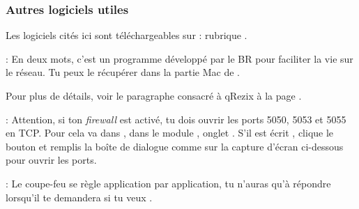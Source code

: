 \subsubsection{Autres logiciels utiles}

Les logiciels cités ici sont téléchargeables sur  : rubrique .

 \noindent{} : En deux mots, c'est un programme développé par le BR pour faciliter la vie sur le réseau. Tu peux le récupérer dans la partie Mac de \xshare.

\noindent Pour plus de détails, voir le paragraphe consacré à qRezix à la page \pageref{qrezix}.

\noindent  {} : Attention, si ton \emph{firewall} est activé, tu dois ouvrir les ports 5050, 5053 et 5055 en TCP. Pour cela va dans , dans le module , onglet . S'il est écrit , clique le bouton  et remplis la boîte de dialogue comme sur la capture d'écran ci-dessous pour ouvrir les ports.


\noindent {} : Le coupe-feu se règle application par application, tu n'auras qu'à répondre  lorsqu'il te demandera si tu veux .



